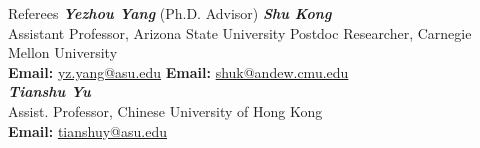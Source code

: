 \documentclass{resume} %
\begin{document}
\begin{rSection}{Referees}
\textbf{\textit{Yezhou Yang}} (Ph.D. Advisor) \hspace{27mm} {\textbf{\textit{Shu Kong}}}\\
Assistant Professor, Arizona State University \hfill  Postdoc Researcher, Carnegie Mellon University\\
\textbf{Email: }\url{yz.yang@asu.edu} \hspace{36.7mm} \textbf{Email: } \url{shuk@andew.cmu.edu} \\

\textbf{\textit{Tianshu Yu}} \\
Assist. Professor, Chinese University of Hong Kong \\
\textbf{Email: }\url{tianshuy@asu.edu} 

\end{rSection}
\end{document}
